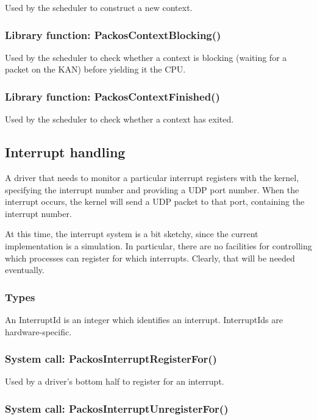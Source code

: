 \documentclass{article}
\begin{document}
Used by the scheduler to construct a new context.

\subsubsection{Library function: PackosContextBlocking()}

Used by the scheduler to check whether a context is blocking (waiting
for a packet on the KAN) before yielding it the CPU.

\subsubsection{Library function: PackosContextFinished()}

Used by the scheduler to check whether a context has exited.

\subsection{Interrupt handling}

A driver that needs to monitor a particular interrupt registers with
the kernel, specifying the interrupt number and providing a UDP port
number.  When the interrupt occurs, the kernel will send a UDP packet
to that port, containing the interrupt number.

At this time, the interrupt system is a bit sketchy, since the current
implementation is a simulation.  In particular, there are no
facilities for controlling which processes can register for which
interrupts.  Clearly, that will be needed eventually.

\subsubsection{Types}

An InterruptId is an integer which identifies an interrupt.
InterruptIds are hardware-specific.

\subsubsection{System call: PackosInterruptRegisterFor()}

Used by a driver's bottom half to register for an interrupt.

\subsubsection{System call: PackosInterruptUnregisterFor()}
\end{document}
